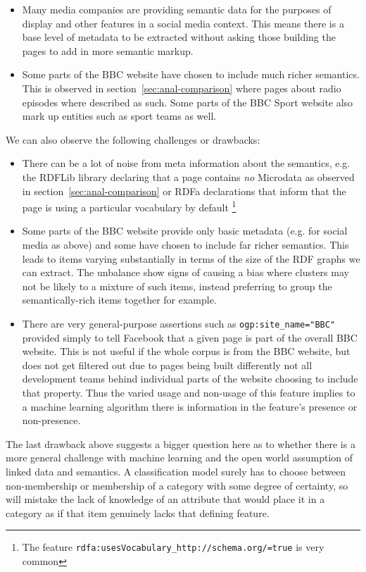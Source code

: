 \begin{itemize}
\item Many media companies are providing semantic data for the
  purposes of display and other features in a social media context.
  This means there is a base level of metadata to be extracted
  without asking those building the pages to add in more semantic
  markup.
\item Some parts of the BBC website have chosen to include
  much richer semantics. This is observed in
  section~\ref{sec:anal-comparison} where pages about radio
  episodes where described as such. Some parts of the BBC Sport
  website also mark up entities such as sport teams as well.
\end{itemize}

We can also observe the following challenges or drawbacks:

\begin{itemize}
\item There can be a lot of noise from meta information about the
  semantics, e.g. the RDFLib library declaring that a page contains
  \emph{no} Microdata as observed in section~\ref{sec:anal-comparison}
  or RDFa declarations that inform that the page is using a particular
  vocabulary by default
  \footnote{The feature
    \texttt{rdfa:usesVocabulary\_http://schema.org/=true} is very
  common}
\item Some parts of the BBC website provide only basic metadata
  (e.g. for social media as above) and some have chosen to include
  far richer semantics. This leads to items varying substantially in
  terms of the size of the RDF graphs we can extract. The
  unbalance show signs of causing a bias where clusters may not be
  likely to a mixture of such items, instead preferring to group
  the semantically-rich items together for example.
\item There are very general-purpose assertions such as
  \texttt{ogp:site\_name="BBC"} provided simply to tell Facebook that
  a given page is part of the overall BBC website. This is not useful
  if the whole corpus is from the BBC website, but does not get
  filtered out due to pages being built differently not all
  development teams behind individual parts of the website choosing
  to include that property. Thus the varied usage and non-usage of
  this feature implies to a machine learning algorithm there is
  information in the feature's presence or non-presence.
\end{itemize}

The last drawback above suggests
a bigger question here as to whether there is a more general
challenge with machine learning and the open world assumption of
linked data and semantics. A classification model surely has to
choose between non-membership or membership of a category with
some degree of certainty, so will mistake the lack of knowledge
of an attribute that would place it in a category as if that item
genuinely lacks that defining feature.

